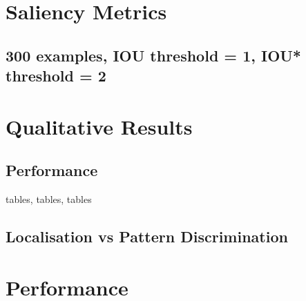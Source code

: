\documentclass[main]{subfiles}
\begin{document}
\section{Saliency Metrics}
\subsection{300 examples, IOU threshold = 1, IOU* threshold = 2}


\section{Qualitative Results}
\subsection{Performance}

tables, tables, tables

\subsection{Localisation vs Pattern Discrimination}

\section{Performance}
\end{document}
